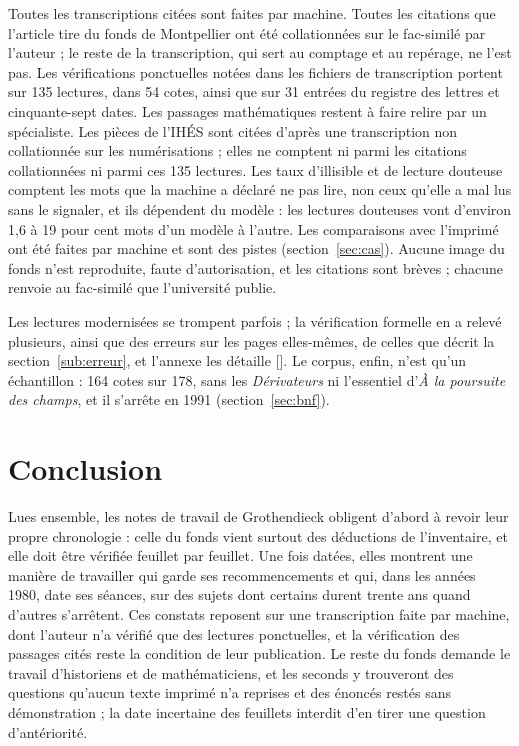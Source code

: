 \documentclass[11pt]{amsart}
\newcommand{\autocite}[1]{\citealp{hua2026#1}}
\begin{document}
Toutes les transcriptions citées sont faites par machine. Toutes les citations que l'article tire du fonds de Montpellier ont été collationnées sur le fac-similé par l'auteur ; le reste de la transcription, qui sert au comptage et au repérage, ne l'est pas. Les vérifications ponctuelles notées dans les fichiers de transcription portent sur 135 lectures, dans 54 cotes, ainsi que sur 31 entrées du registre des lettres et cinquante-sept dates. Les passages mathématiques restent à faire relire par un spécialiste. Les pièces de l'IHÉS sont citées d'après une transcription non collationnée sur les numérisations ; elles ne comptent ni parmi les citations collationnées ni parmi ces 135 lectures. Les taux d'illisible et de lecture douteuse comptent les mots que la machine a déclaré ne pas lire, non ceux qu'elle a mal lus sans le signaler, et ils dépendent du modèle : les lectures douteuses vont d'environ 1,6 à 19 pour cent mots d'un modèle à l'autre. Les comparaisons avec l'imprimé ont été faites par machine et sont des pistes (section~\ref{sec:cas}). Aucune image du fonds n'est reproduite, faute d'autorisation, et les citations sont brèves ; chacune renvoie au fac-similé que l'université publie.

Les lectures modernisées se trompent parfois ; la vérification formelle en a relevé plusieurs, ainsi que des erreurs sur les pages elles-mêmes, de celles que décrit la section~\ref{sub:erreur}, et l'annexe les détaille [\autocite{b}]. Le corpus, enfin, n'est qu'un échantillon : 164 cotes sur 178, sans les \emph{Dérivateurs} ni l'essentiel d'\emph{À la poursuite des champs}, et il s'arrête en 1991 (section~\ref{sec:bnf}).

\section{Conclusion}

Lues ensemble, les notes de travail de Grothendieck obligent d'abord à revoir leur propre chronologie : celle du fonds vient surtout des déductions de l'inventaire, et elle doit être vérifiée feuillet par feuillet. Une fois datées, elles montrent une manière de travailler qui garde ses recommencements et qui, dans les années 1980, date ses séances, sur des sujets dont certains durent trente ans quand d'autres s'arrêtent. Ces constats reposent sur une transcription faite par machine, dont l'auteur n'a vérifié que des lectures ponctuelles, et la vérification des passages cités reste la condition de leur publication. Le reste du fonds demande le travail d'historiens et de mathématiciens, et les seconds y trouveront des questions qu'aucun texte imprimé n'a reprises et des énoncés restés sans démonstration ; la date incertaine des feuillets interdit d'en tirer une question d'antériorité.
\end{document}
